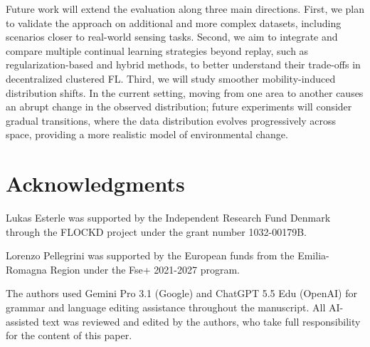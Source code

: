 \documentclass[conference]{IEEEtran}
\theoremstyle{plain}
\theoremstyle{definition}
\begin{document}
Future work will extend the evaluation along three main directions.
%
First,
 we plan to validate the approach on additional and more complex datasets,
 including scenarios closer to real-world sensing tasks. 
% 
Second, 
 we aim to integrate and compare multiple continual learning strategies beyond replay,
 such as regularization-based and hybrid methods, 
 to better understand their trade-offs in decentralized clustered FL. 
% 
Third, 
 we will study smoother mobility-induced distribution shifts. 
% 
In the current setting, 
 moving from one area to another causes an abrupt change in the observed distribution;
 future experiments will consider gradual transitions, 
 where the data distribution evolves progressively across space, 
 providing a more realistic model of environmental change.

\section*{Acknowledgments}
Lukas Esterle was supported by the Independent Research Fund Denmark through the FLOCKD project under the grant number 1032-00179B.

Lorenzo Pellegrini was supported by the European funds from the Emilia-Romagna Region under the Fse+ 2021-2027 program.

The authors used Gemini Pro 3.1 (Google) 
 and ChatGPT 5.5 Edu (OpenAI) for grammar 
 and language editing assistance throughout the manuscript. 
%
All AI-assisted text was reviewed and edited by the authors, 
 who take full responsibility for the content of this paper.



\end{document}
